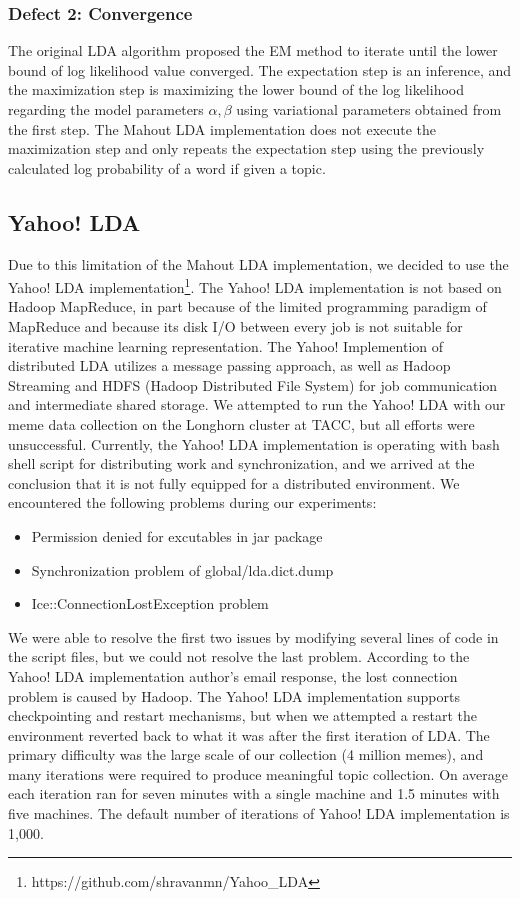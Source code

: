 \documentclass{sig-alternate}
\begin{document}
\subsubsection{Defect 2: Convergence}
The original LDA algorithm proposed the EM method to iterate until the lower bound of log likelihood value converged. The expectation step is an inference, and the maximization step is maximizing the lower bound of the log likelihood regarding the model parameters $\alpha, \beta$ using variational parameters obtained from the first step. The Mahout LDA implementation does not execute the maximization step and only repeats the expectation step using the previously calculated log probability of a word if given a topic.

\subsection{Yahoo! LDA}
Due to this limitation of the Mahout LDA implementation, we decided to use the Yahoo! LDA implementation\footnote{https://github.com/shravanmn/Yahoo\_LDA}. The Yahoo! LDA implementation is not based on Hadoop MapReduce, in part because of the limited programming paradigm of MapReduce and because its disk I/O between every job is not suitable for iterative machine learning representation. The Yahoo! Implemention of distributed LDA utilizes a message passing approach, as well as  Hadoop Streaming and HDFS (Hadoop Distributed File System) for job communication and intermediate shared storage. We attempted to run the Yahoo! LDA with our meme data collection on the Longhorn cluster at TACC, but all efforts were unsuccessful. Currently, the Yahoo! LDA implementation is operating with bash shell script for distributing work and synchronization, and we arrived at the conclusion that it is not fully equipped for a distributed environment. We encountered the following problems during our experiments:
\begin{itemize}
 \item Permission denied for excutables in jar package
 \item Synchronization problem of global/lda.dict.dump
 \item Ice::ConnectionLostException problem 
\end{itemize}
We were able to resolve the first two issues by modifying several lines of code in the script files, but we could not resolve the last problem. According to the Yahoo! LDA implementation author's email response, the lost connection problem is caused by Hadoop. The Yahoo! LDA implementation supports checkpointing and restart mechanisms, but when we attempted a restart the environment reverted back to what it was after the first iteration of LDA. The primary difficulty was the large scale of our collection (4 million memes), and many iterations were required to produce meaningful topic collection. On average each iteration ran for seven minutes with a single machine and 1.5 minutes with five machines. The default number of iterations of Yahoo! LDA implementation is 1,000.
\end{document}
